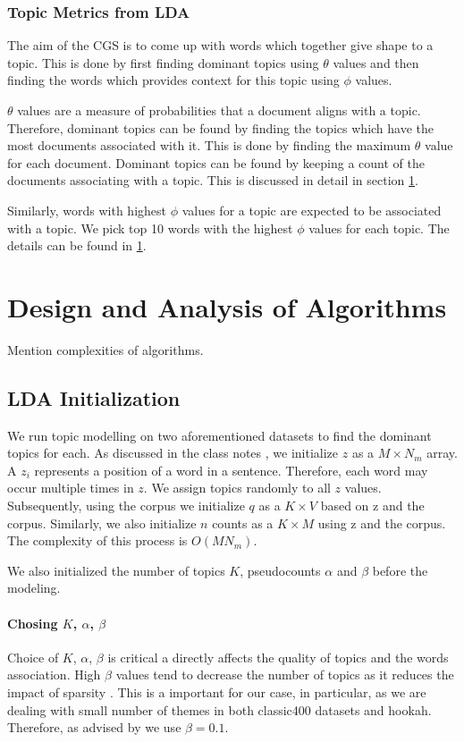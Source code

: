 \documentclass[11pt,a4paper,oneside]{article}
\begin{document}
\subsubsection{Topic Metrics from LDA}
The aim of the CGS is to come up with words which together give shape to a topic. This is done by first finding dominant topics using $\theta$ values and then finding the words which provides context for this topic using $\phi$ values. 

$\theta$ values are a measure of probabilities that a document aligns with a topic. Therefore, dominant topics can be found by finding the topics which have the most documents associated with it. This is done by finding the maximum $\theta$ value for each document. Dominant topics can be found by keeping a count of the documents associating with a topic. This is discussed in detail in section \ref{sec:Algorithms}.

Similarly, words with highest $\phi$ values for a topic are expected to be associated with a topic. We pick top 10 words with the highest $\phi$ values for each topic. The details can be found in \ref{sec:Algorithms}.

\section{Design and Analysis of Algorithms}
\label{sec:Algorithms}

Mention complexities of algorithms.

\subsection{LDA Initialization}
We run topic modelling on two aforementioned datasets to find the dominant topics for each. As discussed in the class notes \cite{classNotes}, we initialize $z$ as a $M \times N_m$ array. A $z_i$ represents a position of a word in a sentence. Therefore, each word may occur multiple times in $z$. We assign topics randomly to all $z$ values.  Subsequently, using the corpus we initialize $q$ as a $K \times V$ based on z and the corpus. Similarly, we also initialize $n$ counts as a $K \times M$ using z and the corpus. The complexity of this process is $O(MN_m)$.

We also initialized the number of topics $K$, pseudocounts $\alpha$ and $\beta$ before the modeling.

\paragraph{Chosing $K$, $\alpha$, $\beta$}
Choice of $K$, $\alpha$, $\beta$ is critical a directly affects the quality of topics and the words association. High $\beta$ values tend to decrease the number of topics as it reduces the impact of sparsity \cite{griffiths2004finding}. This is a important for our case, in particular, as we are dealing with small number of themes in both classic400 datasets and hookah. Therefore, as advised by \cite{griffiths2004finding} we use $\beta = 0.1$. 
\end{document}
